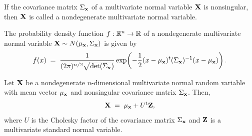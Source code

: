 \begin{definition}
If the covariance matrix $\Sigma_{\mathbf{x}}$ of a multivariate normal variable $\mathbf{X}$ is
nonsingular, then $\mathbf{X}$ is called a nondegenerate multivariate normal variable.
\end{definition}

The probability density function $f:\mathbb{R}^n\to\mathbb{R}$ of a nondegenerate multivariate normal variable
$\mathbf{X}\sim N(\mu_{\mathbf{x}},\Sigma_{\mathbf{x}})$ is given by
\begin{equation}
f(x) \;=\; \frac{1}{(2\pi)^{n/2}\sqrt{\det(\Sigma_{\mathbf{x}})}}
\exp\!\left(-\frac12(x-\mu_{\mathbf{x}})^t(\Sigma_{\mathbf{x}})^{-1}(x-\mu_{\mathbf{x}})\right).
\end{equation}

\begin{lemma}
Let $\mathbf{X}$ be a nondegenerate $n$-dimensional multivariate normal random variable with mean
vector $\mu_{\mathbf{x}}$ and nonsingular covariance matrix $\Sigma_{\mathbf{x}}$. Then,
\[
\mathbf{X} \;=\; \mu_{\mathbf{x}} + U^t\mathbf{Z},
\]
where $U$ is the Cholesky factor of the covariance matrix $\Sigma_{\mathbf{x}}$ and $\mathbf{Z}$ is a
multivariate standard normal variable.
\end{lemma}
